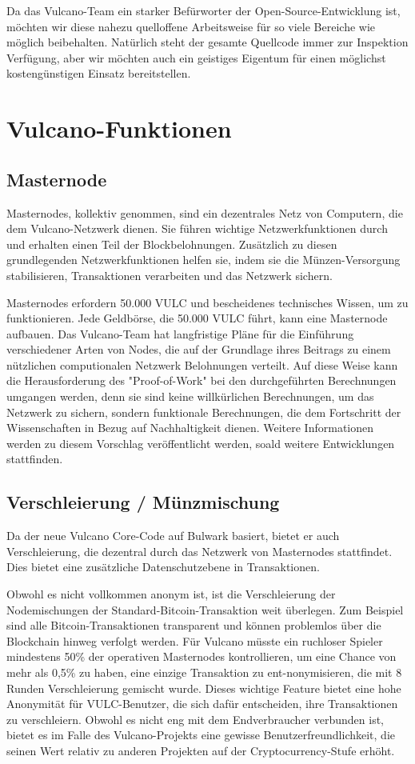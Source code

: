 \documentclass[A4paper, 12pt]{article}
\begin{document}
Da das Vulcano-Team ein starker Befürworter der Open-Source-Entwicklung ist, möchten wir diese nahezu quelloffene Arbeitsweise für so viele Bereiche wie möglich beibehalten. Natürlich steht der gesamte Quellcode immer zur Inspektion Verfügung, aber wir möchten auch ein geistiges Eigentum für einen möglichst kostengünstigen Einsatz bereitstellen. 

\section{Vulcano-Funktionen}
\subsection {Masternode}
Masternodes, kollektiv genommen, sind ein dezentrales Netz von Computern, die dem Vulcano-Netzwerk dienen. Sie führen wichtige Netzwerkfunktionen durch und erhalten einen Teil der Blockbelohnungen. Zusätzlich zu diesen grundlegenden Netzwerkfunktionen helfen sie, indem sie die Münzen-Versorgung stabilisieren, Transaktionen verarbeiten und das Netzwerk sichern.

Masternodes erfordern 50.000 VULC und bescheidenes technisches Wissen, um zu funktionieren. Jede Geldbörse, die 50.000 VULC führt, kann eine Masternode aufbauen. Das Vulcano-Team hat langfristige Pläne für die Einführung verschiedener Arten von Nodes, die auf der Grundlage ihres Beitrags zu einem nützlichen computionalen Netzwerk Belohnungen verteilt. Auf diese Weise kann die Herausforderung des "Proof-of-Work" bei den durchgeführten Berechnungen umgangen werden, denn sie sind keine willkürlichen Berechnungen, um das Netzwerk zu sichern, sondern funktionale Berechnungen, die dem Fortschritt der Wissenschaften in Bezug auf Nachhaltigkeit dienen. Weitere Informationen werden zu diesem Vorschlag veröffentlicht werden, soald weitere Entwicklungen stattfinden. 

\subsection{Verschleierung / Münzmischung}
Da der neue Vulcano Core-Code auf Bulwark basiert, bietet er auch Verschleierung, die dezentral durch das Netzwerk von Masternodes stattfindet. Dies bietet eine zusätzliche Datenschutzebene in Transaktionen. 

Obwohl es nicht vollkommen anonym ist, ist die Verschleierung der Nodemischungen der Standard-Bitcoin-Transaktion weit überlegen. Zum Beispiel sind alle Bitcoin-Transaktionen transparent und können problemlos über die Blockchain hinweg verfolgt werden. Für Vulcano müsste ein ruchloser Spieler mindestens 50\% der operativen Masternodes kontrollieren, um eine Chance von mehr als 0,5\% zu haben, eine einzige Transaktion zu ent-nonymisieren, die mit 8 Runden Verschleierung gemischt wurde. Dieses wichtige Feature bietet eine hohe Anonymität für VULC-Benutzer, die sich  dafür entscheiden, ihre Transaktionen zu verschleiern. Obwohl es nicht eng mit dem Endverbraucher verbunden ist, bietet es im Falle des Vulcano-Projekts eine gewisse Benutzerfreundlichkeit, die seinen Wert relativ zu anderen Projekten auf der Cryptocurrency-Stufe erhöht. 
\end{document}
